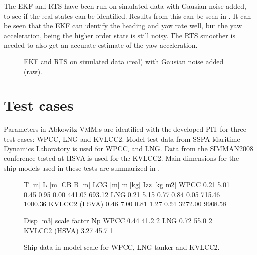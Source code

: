 \documentclass[review]{elsarticle}
\begin{document}
\sphinxAtStartPar
The EKF and RTS have been run on simulated data with Gausian noise added, to see if the real states can be identified. Results from this can be seen in  {\hyperref[\detokenize{04.01_EK:fig-ekf}]{}}. It can be seen that the EKF can identify the heading and yaw rate well, but the yaw acceleration, being the higher order state is still noisy. The RTS smoother is needed to also get an accurate estimate of the yaw acceleration.

\begin{figure}[htbp]
\centering
\capstart

\noindent{}
\caption{EKF and RTS on simulated data (real) with Gausian noise added (raw).}\label{\detokenize{04.01_EK:fig-ekf}}\end{figure}


\section{Test cases}
\label{\detokenize{05.01_model_tests:test-cases}}\label{\detokenize{05.01_model_tests::doc}}
\sphinxAtStartPar
Parameters in Abkowitz VMM:s are identified with the developed PIT for three test cases: WPCC, LNG and KVLCC2. Model test data from SSPA Maritime Dynamics Laboratory is used for WPCC, and LNG. Data from the SIMMAN2008 conference tested at HSVA is used for the KVLCC2. Main dimensions for the ship models used in these tests are summarized in {\hyperref[\detokenize{05.01_model_tests:ship-datas}]{}}.

\begin{figure}[htbp]
\centering
\capstart

\begin{sphinxVerbatim}[commandchars=\\\{\}]
               T [m]  L [m]    CB  B [m]  LCG [m]   m [kg]  Izz [kg m2]  \PYGZbs{}
WPCC            0.21   5.01  0.45   0.95     0.00   441.03       693.12   
LNG             0.21   5.15  0.77   0.84    \PYGZhy{}0.05   715.46      1000.36   
KVLCC2 (HSVA)   0.46   7.00  0.81   1.27     0.24  3272.00      9908.58   

               Disp [m3]  scale factor  Np  
WPCC                0.44          41.2   2  
LNG                 0.72          55.0   2  
KVLCC2 (HSVA)       3.27          45.7   1  
\end{sphinxVerbatim}
\caption{Ship data in model scale for WPCC, LNG tanker and KVLCC2.}\label{\detokenize{05.01_model_tests:ship-datas}}\end{figure}
\end{document}
